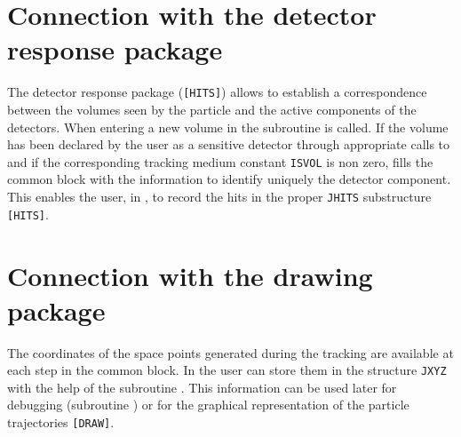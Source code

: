 \section{Connection with the detector response package}
The detector response package ({\tt [HITS]}) allows to establish a 
correspondence between the volumes seen by the particle and
the active components of the detectors. When entering a new volume in
 the subroutine
 is called. If the volume has been declared by the user as a
sensitive detector through appropriate calls to  and if the
corresponding tracking medium constant {\tt ISVOL} is non zero,
 fills the common block  with the information to
identify uniquely the detector component. This enables the user, in
, to record the
hits in the proper {\tt JHITS} substructure {\tt[HITS]}.

\section{Connection with the drawing package}
The coordinates of the space points generated during the tracking are
available at each step in the common block. In
 the user can store them in the structure {\tt JXYZ} with the
help of the subroutine . This information can be used later
for debugging (subroutine ) or for the graphical representation
of the particle trajectories {\tt[DRAW]}.
